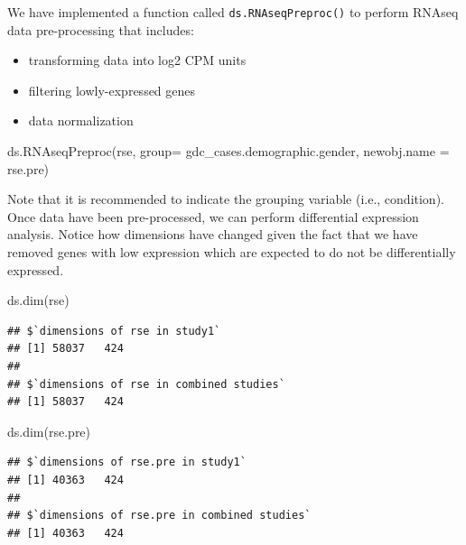 \documentclass[
]{book}
\newenvironment{Shaded}{\begin{snugshade}}{\end{snugshade}}
\newcommand{\AttributeTok}[1]{\textcolor[rgb]{0.77,0.63,0.00}{#1}}
\newcommand{\FunctionTok}[1]{\textcolor[rgb]{0.00,0.00,0.00}{#1}}
\newcommand{\NormalTok}[1]{#1}
\newcommand{\StringTok}[1]{\textcolor[rgb]{0.31,0.60,0.02}{#1}}
\providecommand{\tightlist}{%
  \setlength{\itemsep}{0pt}\setlength{\parskip}{0pt}}
\begin{document}
We have implemented a function called \texttt{ds.RNAseqPreproc()} to perform RNAseq data pre-processing that includes:

\begin{itemize}
\tightlist
\item
  transforming data into log2 CPM units
\item
  filtering lowly-expressed genes
\item
  data normalization
\end{itemize}

\begin{Shaded}
\begin{Highlighting}[]
\FunctionTok{ds.RNAseqPreproc}\NormalTok{(}\StringTok{\textquotesingle{}rse\textquotesingle{}}\NormalTok{, }\AttributeTok{group=} \StringTok{\textquotesingle{}gdc\_cases.demographic.gender\textquotesingle{}}\NormalTok{, }
                 \AttributeTok{newobj.name =} \StringTok{\textquotesingle{}rse.pre\textquotesingle{}}\NormalTok{)}
\end{Highlighting}
\end{Shaded}

Note that it is recommended to indicate the grouping variable (i.e., condition). Once data have been pre-processed, we can perform differential expression analysis. Notice how dimensions have changed given the fact that we have removed genes with low expression which are expected to do not be differentially expressed.

\begin{Shaded}
\begin{Highlighting}[]
\FunctionTok{ds.dim}\NormalTok{(}\StringTok{\textquotesingle{}rse\textquotesingle{}}\NormalTok{)}
\end{Highlighting}
\end{Shaded}

\begin{verbatim}
## $`dimensions of rse in study1`
## [1] 58037   424
## 
## $`dimensions of rse in combined studies`
## [1] 58037   424
\end{verbatim}

\begin{Shaded}
\begin{Highlighting}[]
\FunctionTok{ds.dim}\NormalTok{(}\StringTok{\textquotesingle{}rse.pre\textquotesingle{}}\NormalTok{)}
\end{Highlighting}
\end{Shaded}

\begin{verbatim}
## $`dimensions of rse.pre in study1`
## [1] 40363   424
## 
## $`dimensions of rse.pre in combined studies`
## [1] 40363   424
\end{verbatim}
\end{document}

